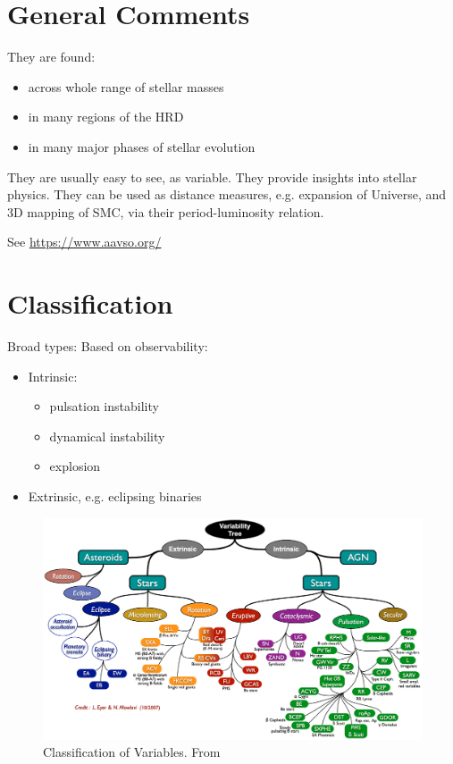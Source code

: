 \documentclass{spy}
\begin{document}
\tableofcontents

\section{General Comments}
They are found:
\begin{itemize}
    \item across whole range of stellar masses
    \item in many regions of the HRD
    \item in many major phases of stellar evolution
\end{itemize}

They are usually easy to see, as variable.
They provide insights into stellar physics.
They can be used as distance measures, e.g. expansion of Universe, and 3D mapping of SMC, via their period-luminosity relation.


See \url{https://www.aavso.org/}

\section{Classification}
Broad types:
Based on observability:
\begin{itemize}
\item Intrinsic:
    \begin{itemize}
    \item pulsation instability
    \item dynamical instability
    \item explosion
    \end{itemize}
\item Extrinsic, e.g. eclipsing binaries
\end{itemize}

\begin{figure}[ht]
    \centering
    \includegraphics[width=\textwidth]{variable_classes.eps}
    \caption{Classification of Variables. From \citet{eyerVariableStarsObservational2008}}
    \label{variable_classes_diagram}
\end{figure}
\end{document}
